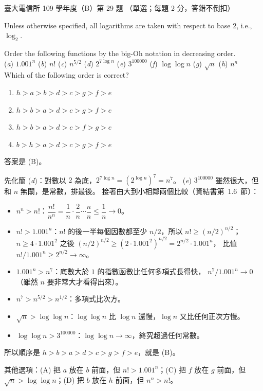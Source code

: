 \begin{pastexam}[label={px:ntu-109-comm-dsa-29}]{臺大電信所 109 學年度（B）第 29 題}
（單選；每題 2 分，答錯不倒扣）

Unless otherwise specified, all logarithms are taken with respect to base 2, i.e., $\log_2$.

Order the following functions by the big-Oh notation in decreasing order.\\
(\textit{a}) $1.001^n$ \quad (\textit{b}) $n!$ \quad (\textit{c}) $n^{5/2}$ \quad (\textit{d}) $2^{7\log n}$
\quad (\textit{e}) $3^{100000}$ \quad (\textit{f}) $\log\log n$ \quad (\textit{g}) $\sqrt{n}$ \quad
(\textit{h}) $n^n$\\
Which of the following order is correct?
\begin{enumerate}[label=(\Alph*)]
\item $h>a>b>d>c>g>f>e$
\item $h>b>a>d>c>g>f>e$
\item $h>b>a>d>c>f>g>e$
\item $b>h>a>d>c>g>f>e$
\end{enumerate}
\end{pastexam}

\begin{pastsoln}
答案是 (B)。

先化簡 (\textit{d})：對數以 $2$ 為底，$2^{7\log n} = (2^{\log n})^7 = n^7$。 (\textit{e}) $3^{100000}$
雖然很大，但和 $n$ 無關，是常數，排最後。 接著由大到小相鄰兩個比較（資結書第~1.6~節）：
\begin{itemize}
\item $n^n > n!$：$\dfrac{n!}{n^n} = \dfrac{1}{n}\cdot\dfrac{2}{n}\cdots\dfrac{n}{n} \le \dfrac{1}{n}
\to 0$。
\item $n! > 1.001^n$：$n!$ 的後一半每個因數都至少 $n/2$，所以 $n! \ge (n/2)^{n/2}$；
$n \ge 4 \cdot 1.001^2$ 之後 $(n/2)^{n/2} \ge (2 \cdot 1.001^2)^{n/2} = 2^{n/2} \cdot 1.001^n$，
比值 $n!/1.001^n \ge 2^{n/2} \to \infty$。
\item $1.001^n > n^7$：底數大於 $1$ 的指數函數比任何多項式長得快，
$n^7 / 1.001^n \to 0$（雖然 $n$ 要非常大才看得出來）。
\item $n^7 > n^{5/2} > n^{1/2}$：多項式比次方。
\item $\sqrt{n} > \log\log n$：$\log\log n$ 比 $\log n$ 還慢，$\log n$ 又比任何正次方慢。
\item $\log\log n > 3^{100000}$：$\log\log n \to \infty$，終究超過任何常數。
\end{itemize}
所以順序是 $h > b > a > d > c > g > f > e$，就是 (B)。

其他選項：(A) 把 $a$ 放在 $b$ 前面，但 $n! > 1.001^n$；(C) 把 $f$ 放在 $g$ 前面，但
$\sqrt{n} > \log\log n$；(D) 把 $b$ 放在 $h$ 前面，但 $n^n > n!$。
\end{pastsoln}
